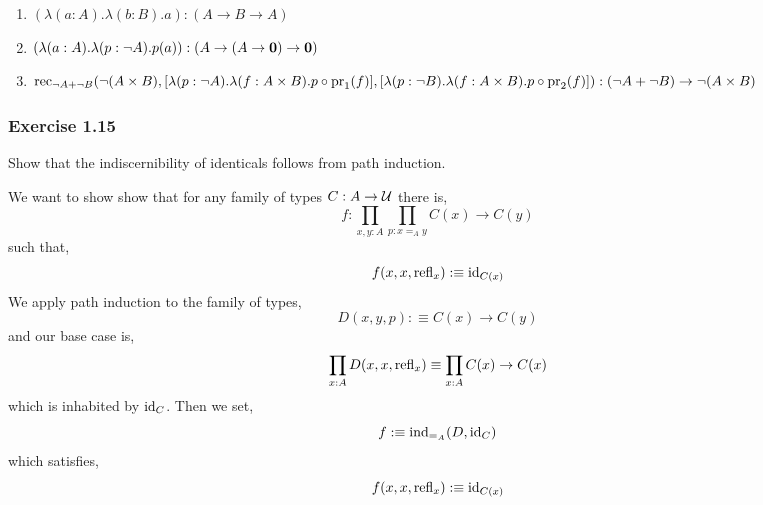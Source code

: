 \documentclass[12pt]{article}
\begin{document}
\begin{enumerate}
\item $(\lambda (a : A). \lambda (b : B). a) : (A \to B \to A)$
\item $(\lambda (a : A) . \lambda (p : \neg A) . p(a)) : (A \to (A \to \bf{0}) \to \bf{0})$
\item $\rec_{\neg A + \neg B}(\neg (A \times B), [\lambda (p : \neg A) . \lambda (f : A \times B) . p \circ \pr_1(f)], [\lambda (p : \neg B) . \lambda (f : A \times B) . p \circ \pr_2(f)]) : (\neg A + \neg B) \to \neg (A \times B)$
\end{enumerate}

\subsubsection{Exercise 1.15}

\begin{exercise}
Show that the indiscernibility of identicals follows from path induction.
\end{exercise}

We want to show show that for any family of types $C : A \to \U$ there is,
\[ f : \prod_{x,y : A} \prod_{p : x =_A y} C(x) \to C(y) \]
such that,
\[ f(x, x, \refl_x) :\equiv \id_{C(x)} \]
We apply path induction to the family of types,
\[ D(x,y,p) : \equiv C(x) \to C(y) \]
and our base case is,
\[ \prod_{x : A} D(x,x,\refl_x) \equiv \prod_{x : A} C(x) \to C(x) \]
which is inhabited by $\id_C$. Then we set,
\[ f :\equiv \ind_{=_A}(D, \id_C) \]
which satisfies,
\[ f(x,x,\refl_x) :\equiv \id_{C(x)} \]
\end{document}
